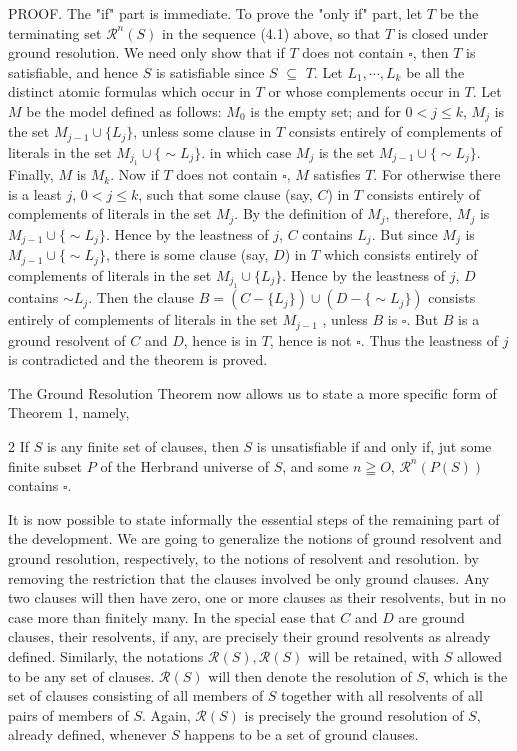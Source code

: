 \documentclass[8pt]{extarticle}
\begin{document}
PROOF. The "if" part is immediate. To prove the "only if" part, let $T$ be the
terminating set $\mathcal{R}^n(S)$ in the sequence (4.1) above, so that $T$ is closed under ground resolution. We need only show that if $T$ does not contain $\square$, then $T$ is satisfiable, and hence $S$ is satisfiable since $S$ $\subseteq$ $T$. Let $L_1, \dotsm , L_k$ be all the distinct atomic formulas which occur in $T$ or whose complements occur in $T$. Let $M$ be the model defined as follows: $M_0$ is the empty set; and for $0 < j \leq k$, $M_j$ is the set $M_{j-1} \cup \{L_j\}$, unless some clause in $T$ consists entirely of complements of literals in the set $M_{j_1}\cup\{\sim L_j\}$. in which case $M_j$ is the set $M_{j-1}\cup\{\sim L_j\}$. Finally, $M$ is $M_k$. Now if $T$ does not contain $\square$, $M$ satisfies $T$. For otherwise there is a least $j$, $0 < j \leq k$, such that some clause (say, $C$) in $T$ consists entirely of complements of literals in the set $M_j$. By the definition of $M_j$, therefore, $M_j$ is $M_{j-1} \cup \{\sim L_j\}$. Hence by the leastness of $j$, $C$ contains $L_j$. But since $M_j$ is $M_{j-1}\cup \{\sim L_j\}$, there is some clause (say, $D$) in $T$ which consists entirely of complements of literals in the set $M_{j_1}\cup \{L_j\}$. Hence by the leastness of $j$, $D$ contains $\sim L_j$. Then the clause $B = (C - \{L_j\}) \cup (D - \{\sim L_j\})$ consists entirely of complements of literals in the set $M_{j-1}$ , unless $B$ is $\square$. But $B$ is a ground resolvent of $C$ and $D$, hence is in $T$, hence is not $\square$. Thus the leastness of $j$ is contradicted and the theorem is proved.

The Ground Resolution Theorem now allows us to state a more specific form
of Theorem 1, namely,


\begin{p7theorem}{2}\label{two}
If $S$ is any finite set of clauses, then $S$ is unsatisfiable if and only
if, jut some finite subset $P$ of the Herbrand universe of $S$, and some $n \geqq O$, $\mathcal{R}^n(P(S))$ contains $\square$.
\end{p7theorem}

It is now possible to state informally the essential steps of the remaining part of the development. We are going to generalize the notions of ground resolvent and ground resolution, respectively, to the notions of resolvent and resolution. by removing the restriction that the clauses involved be only ground clauses. Any two clauses will then have zero, one or more clauses as their resolvents, but in no case more than finitely many. In the special ease that $C$ and $D$ are ground clauses, their resolvents, if any, are precisely their ground resolvents as already defined. Similarly, the notations $\mathcal{R}(S), \mathcal{R}(S)$ will be retained, with $S$ allowed to be any set of clauses. $\mathcal{R}(S)$ will then denote the resolution of $S$, which
is the set of clauses consisting of all members of $S$ together with all resolvents of all pairs of members of $S$. Again, $\mathcal{R}(S)$ is precisely the ground resolution of $S$, already defined, whenever $S$ happens to be a set of ground clauses. 
\end{document}
